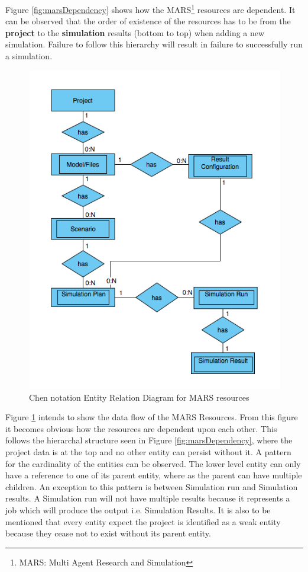         Figure \ref{fig:marsDependency} shows how the MARS\footnote{MARS: Multi Agent Research and Simulation} 
        resources are dependent. It can be observed
        that the order of existence of the resources has to be from the \textbf{project} to the \textbf{simulation} results 
        (bottom to top) when adding a new simulation. Failure to follow this hierarchy will result in failure to
        successfully run a simulation.

        \begin{figure}[H]
            \centering \includegraphics[scale=0.6]{grafiken/ERMars.png}
            \caption{Chen notation Entity Relation Diagram for MARS resources}
            \label{fig:ERMars}
        \end{figure}
        
        Figure \ref{fig:ERMars} intends to show the data flow of the MARS Resources. From this figure it becomes obvious 
        how the resources are dependent upon each other. This follows the hierarchal structure seen in Figure \ref{fig:marsDependency},
        where the project data is at the top and no other entity can persist without it. A pattern for the cardinality of the entities can be observed.
        The lower level entity can only have a reference to one of its parent entity, where as the parent can have multiple children. An exception to this
        pattern is between Simulation run and Simulation results. A Simulation run will not have multiple results because it represents a job which will produce
        the output i.e. Simulation Results. It is also to be mentioned that every entity expect the project is identified as a weak entity because they cease not 
        to exist without its parent entity. 

